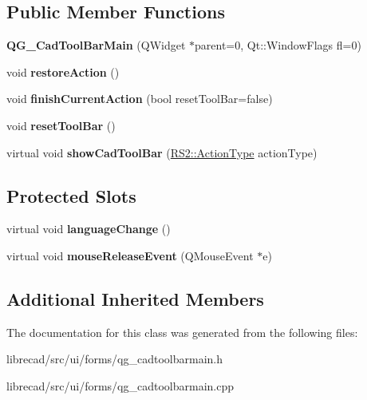 \subsection*{Public Member Functions}
\begin{DoxyCompactItemize}
\item 
\hypertarget{classQG__CadToolBarMain_a2686235491c39dd89d8932e6f6524e66}{{\bfseries Q\-G\-\_\-\-Cad\-Tool\-Bar\-Main} (Q\-Widget $\ast$parent=0, Qt\-::\-Window\-Flags fl=0)}\label{classQG__CadToolBarMain_a2686235491c39dd89d8932e6f6524e66}

\item 
\hypertarget{classQG__CadToolBarMain_af5e77723b7d7cb4648458e3cef4520d8}{void {\bfseries restore\-Action} ()}\label{classQG__CadToolBarMain_af5e77723b7d7cb4648458e3cef4520d8}

\item 
\hypertarget{classQG__CadToolBarMain_a843717b2c6e58d5907e815706a5360d8}{void {\bfseries finish\-Current\-Action} (bool reset\-Tool\-Bar=false)}\label{classQG__CadToolBarMain_a843717b2c6e58d5907e815706a5360d8}

\item 
\hypertarget{classQG__CadToolBarMain_a01de3ef994430b8226074aeaf1ecc10e}{void {\bfseries reset\-Tool\-Bar} ()}\label{classQG__CadToolBarMain_a01de3ef994430b8226074aeaf1ecc10e}

\item 
\hypertarget{classQG__CadToolBarMain_ac652620a1ecdc4bdbef7b944bb674d03}{virtual void {\bfseries show\-Cad\-Tool\-Bar} (\hyperlink{classRS2_afe3523e0bc41fd637b892321cfc4b9d7}{R\-S2\-::\-Action\-Type} action\-Type)}\label{classQG__CadToolBarMain_ac652620a1ecdc4bdbef7b944bb674d03}

\end{DoxyCompactItemize}
\subsection*{Protected Slots}
\begin{DoxyCompactItemize}
\item 
\hypertarget{classQG__CadToolBarMain_a4ee458ae24fe648f49048fa992984f2e}{virtual void {\bfseries language\-Change} ()}\label{classQG__CadToolBarMain_a4ee458ae24fe648f49048fa992984f2e}

\item 
\hypertarget{classQG__CadToolBarMain_a0faacda46c437003ffe88e808a6bee47}{virtual void {\bfseries mouse\-Release\-Event} (Q\-Mouse\-Event $\ast$e)}\label{classQG__CadToolBarMain_a0faacda46c437003ffe88e808a6bee47}

\end{DoxyCompactItemize}
\subsection*{Additional Inherited Members}


The documentation for this class was generated from the following files\-:\begin{DoxyCompactItemize}
\item 
librecad/src/ui/forms/qg\-\_\-cadtoolbarmain.\-h\item 
librecad/src/ui/forms/qg\-\_\-cadtoolbarmain.\-cpp\end{DoxyCompactItemize}
